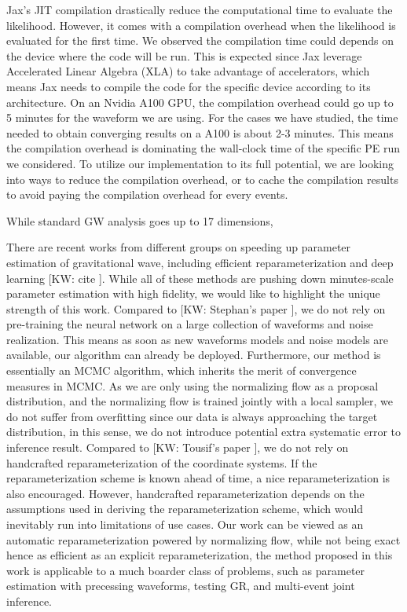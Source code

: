 \documentclass[twocolumn]{aastex631}
\newcommand{\kw}[1]{{\color{rb4}[KW: #1 ]}}
\begin{document}
Jax's JIT compilation drastically reduce the computational time to evaluate the
likelihood. However, it comes with a compilation overhead when the likelihood is
evaluated for the first time. We observed the compilation time could depends on
the device where the code will be run. This is expected since Jax leverage
Accelerated Linear Algebra (XLA) to take advantage of accelerators, which means
Jax needs to compile the code for the specific device according to its
architecture. On an Nvidia A100 GPU, the compilation overhead could go up to 5
minutes for the waveform we are using. For the cases we have studied, the time
needed to obtain converging results on a A100 is about 2-3 minutes. This means
the compilation overhead is dominating the wall-clock time of the specific PE
run we considered. To utilize our implementation to its full potential, we are
looking into ways to reduce the compilation overhead, or to cache the
compilation results to avoid paying the compilation overhead for every events.

While standard GW analysis goes up to 17 dimensions, 


There are recent works from different groups on speeding up parameter estimation
of gravitational wave, including efficient reparameterization and deep learning
\kw{cite}. While all of these methods are pushing down minutes-scale parameter
estimation with high fidelity, we would like to highlight the unique strength of
this work. Compared to \kw{Stephan's paper}, we do not rely on pre-training the
neural network on a large collection of waveforms and noise realization. This
means as soon as new waveforms models and noise models are available, our
algorithm can already be deployed. Furthermore, our method is essentially an
MCMC algorithm, which inherits the merit of convergence measures in MCMC. As we
are only using the normalizing flow as a proposal distribution, and the
normalizing flow is trained jointly with a local sampler, we do not suffer from
overfitting since our data is always approaching the target distribution, in
this sense, we do not introduce potential extra systematic error to inference
result. Compared to \kw{Tousif's paper}, we do not rely on handcrafted
reparameterization of the coordinate systems. If the reparameterization scheme
is known ahead of time, a nice reparameterization is also encouraged. However,
handcrafted reparameterization depends on the assumptions used in deriving the
reparameterization scheme, which would inevitably run into limitations of use
cases. Our work can be viewed as an automatic reparameterization powered by
normalizing flow, while not being exact hence as efficient as an explicit
reparameterization, the method proposed in this work is applicable to a much
boarder class of problems, such as parameter estimation with precessing
waveforms, testing GR, and multi-event joint inference.
\end{document}
